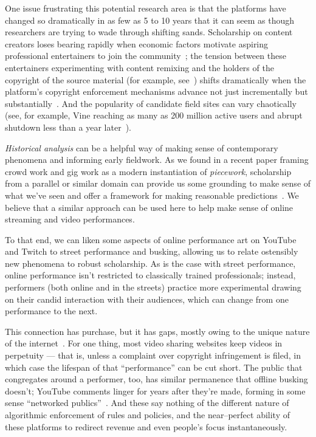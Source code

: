 \documentclass[10pt]{article}
\newcommand{\topic}[1]{{\color{Blue}#1}}
\begin{document}
\topic{One issue frustrating this potential research area is that
the platforms have changed so dramatically in as few as 5 to 10 years that
it can seem as though researchers are trying to wade through shifting sands.}
Scholarship on content creators loses bearing rapidly when
economic factors motivate aspiring professional entertainers to join the community~\cite{Hamilton:2014:STF:2611105.2557048};
the tension between these entertainers experimenting with content remixing and
the holders of the copyright of the source material
(for example, see~\cite{Hilderbrand48})
shifts dramatically when
the platform's copyright enforcement mechanisms advance
not just incrementally but substantially~\cite{kim2012institutionalization}.
And the popularity of candidate field sites can vary chaotically
(see, for example, Vine reaching as many as 200 million active users and
abrupt shutdown less than a year later~\cite{vineDecline}).

\topic{\textit{Historical analysis}
can be a helpful way of
making sense of contemporary phenomena and informing early fieldwork.}
As we found in a recent paper framing crowd work and gig work as a modern instantiation of \textit{piecework},
scholarship from a parallel or similar domain can
provide us some grounding to make sense of what we've seen and offer a framework for making reasonable predictions~\cite{pieceworkCrowdworkGigwork}.
We believe that a similar approach can be used here to help make sense of online streaming and video performances.

\topic{To that end, we can liken some aspects of online performance art on YouTube and Twitch
to street performance and busking,
allowing us to relate ostensibly new phenomena to robust scholarship.}
As is the case with street performance,
online performance isn't restricted to classically trained professionals;
instead, performers (both online and in the streets) practice more experimental 
drawing on their candid interaction with their audiences,
which can change from one performance to the next.

\topic{This connection has purchase, but it has gaps, mostly owing to the unique nature of the internet~\cite{miller2011understanding}.}
For one thing, most video sharing websites keep videos
in perpetuity
--- that is, unless a complaint over copyright infringement is filed, in which case the lifespan of that ``performance'' can be cut short.
The public that congregates around a performer, too, has similar permanence that offline busking doesn't;
YouTube comments linger for years after they're made, forming in some sense ``networked publics''~\cite{boyd2007youth}.
And these say nothing of the different nature of algorithmic enforcement of rules and policies, and
the near--perfect ability of these platforms to redirect revenue and even people's focus instantaneously.
\end{document}
